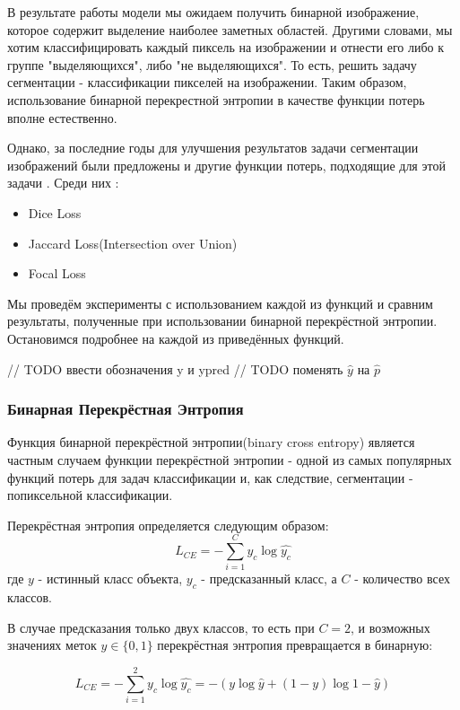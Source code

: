 В результате работы модели мы ожидаем получить бинарной изображение, которое содержит выделение наиболее заметных областей. 
Другими словами, мы хотим классифицировать каждый пиксель на изображении и отнести его либо к группе "выделяющихся", либо "не выделяющихся". То есть,
решить задачу сегментации - классификации пикселей на изображении. Таким образом, использование бинарной перекрестной энтропии 
в качестве функции потерь вполне естественно.

Однако, за последние годы для улучшения результатов задачи сегментации изображений были предложены и другие функции потерь, подходящие для 
этой задачи \cite{Loss-Functions}. Среди них : 

\begin{itemize}
    \item Dice Loss \cite{Dice-Loss}
    \item Jaccard Loss(Intersection over Union) \cite{IoU-Loss}
    \item Focal Loss \cite{Focal-Loss}
\end{itemize}

Мы проведём эксперименты с использованием каждой из функций и сравним результаты, полученные при использовании бинарной перекрёстной энтропии.
Остановимся подробнее на каждой из приведённых функций.

// TODO ввести обозначения y и ypred
// TODO поменять $\hat{y} $ на $\hat{p}$

\subsubsection{Бинарная Перекрёстная Энтропия}

Функция бинарной перекрёстной энтропии(binary cross entropy) является частным случаем функции перекрёстной энтропии - одной из самых популярных 
функций потерь для задач классификации и, как следствие, сегментации - попиксельной классификации.

Перекрёстная энтропия \cite{CE} определяется следующим образом: 
\begin{equation}
    L_{CE} = -\sum_{i=1}^{C}y_c\log{\hat{y_c}}
\end{equation}
где $y$ - истинный класс объекта, $y_c$ - предсказанный класс, а $C$ - количество 
всех классов.

В случае предсказания только двух классов, то есть при $C=2$, 
и возможных значениях меток $y \in \{0,1\}$
перекрёстная энтропия превращается в бинарную:

\begin{equation}
    L_{CE} = -\sum_{i=1}^{2}y_c\log{\hat{y_c}} = 
    -(y\log{\hat{y}} + (1-y)\log{1-\hat{y}})
\end{equation}


